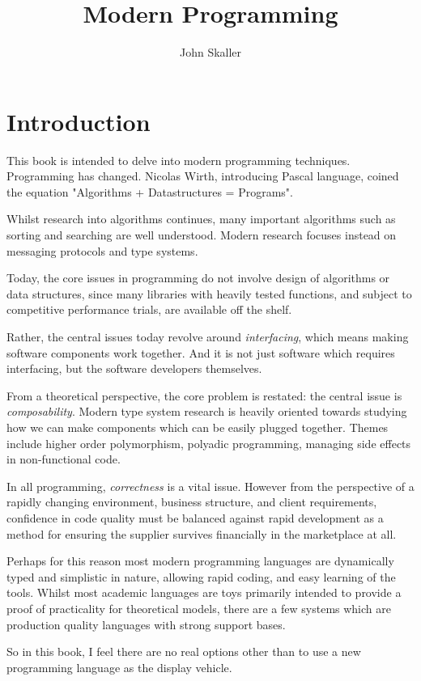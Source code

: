 \documentclass[oneside]{book}
\title{Modern Programming}
\author{John Skaller}
\begin{document}
\maketitle
\tableofcontents
\chapter{Introduction}
This book is intended to delve into modern programming techniques.
Programming has changed. Nicolas Wirth, introducing Pascal language,
coined the equation "Algorithms + Datastructures = Programs".

Whilst research into algorithms continues, many important
algorithms such as sorting and searching are well understood.
Modern research focuses instead on messaging protocols
and type systems.

Today, the core issues in programming do not involve design
of algorithms or data structures, since many libraries with
heavily tested functions, and subject to competitive performance
trials, are available off the shelf.

Rather, the central issues today revolve around {\em interfacing},
which means making software components work together. And it is
not just software which requires interfacing, but the software
developers themselves.

From a theoretical perspective, the core problem is restated:
the central issue is {\em composability}. Modern type system
research is heavily oriented towards studying how we can
make components which can be easily plugged together.
Themes include higher order polymorphism, polyadic programming,
managing side effects in non-functional code.

In all programming, {\em correctness} is a vital issue.
However from the perspective of a rapidly changing
environment, business structure, and client requirements,
confidence in code quality must be balanced against
rapid development as a method for ensuring the supplier
survives financially in the marketplace at all.

Perhaps for this reason most modern programming languages
are dynamically typed and simplistic in nature, allowing
rapid coding, and easy learning of the tools. Whilst most
academic languages are toys primarily intended to provide
a proof of practicality for theoretical models, there are
a few systems which are production quality languages with
strong support bases.

So in this book, I feel there are no real options other than to
use a new programming language as the display vehicle.
\end{document}
